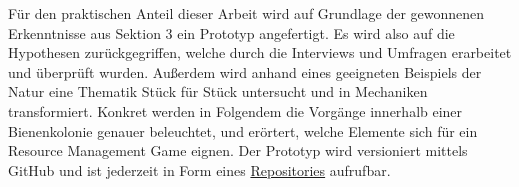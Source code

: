 Für den praktischen Anteil dieser Arbeit wird auf Grundlage der gewonnenen Erkenntnisse aus Sektion 3 ein Prototyp angefertigt. Es wird also auf die Hypothesen zurückgegriffen, welche durch die Interviews und Umfragen erarbeitet und überprüft wurden. Außerdem wird anhand eines geeigneten Beispiels der Natur eine Thematik Stück für Stück untersucht und in Mechaniken transformiert. Konkret werden in Folgendem die Vorgänge innerhalb einer Bienenkolonie genauer beleuchtet, und erörtert, welche Elemente sich für ein Resource Management Game eignen. Der Prototyp wird versioniert mittels GitHub und ist jederzeit in Form eines \href{https://github.com/ProgFroz/hexabees}{Repositories} \cite*[]{repository} aufrufbar.









